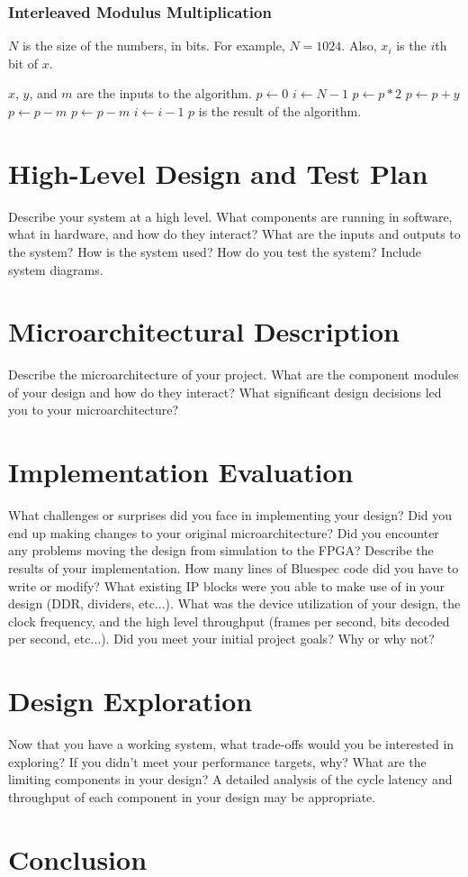 \documentclass[a4paper,11pt]{report}
\begin{document}
\subsection{Interleaved Modulus Multiplication}
$N$ is the size of the numbers, in bits. For example, $N = 1024$.
Also, $x_i$ is the $i$th bit of $x$.
\begin{algorithmic}
\State $x$, $y$, and $m$ are the inputs to the algorithm.
\State $p \gets 0$
\State $i \gets N - 1$
	\State $p \gets p * 2$
		\State $p \gets p + y$
	\EndIf
		\State $p \gets p - m$
	\EndIf
		\State $p \gets p - m$
	\EndIf
  \State $i \gets i - 1$
\EndWhile
\State $p$ is the result of the algorithm.
\end{algorithmic}
\chapter*{High-Level Design and Test Plan} Describe your system at a high level. What components are
running in software, what in hardware, and how do they interact? What are the inputs and
outputs to the system? How is the system used? How do you test the system? Include system
diagrams.
\chapter*{Microarchitectural Description} Describe the microarchitecture of your project. What are the
component modules of your design and how do they interact? What significant design decisions
led you to your microarchitecture?
\chapter*{Implementation Evaluation}
 What challenges or surprises did you face in implementing your
design? Did you end up making changes to your original microarchitecture? Did you encounter
any problems moving the design from simulation to the FPGA?
Describe the results of your implementation. How many lines of Bluespec code did you have to
write or modify? What existing IP blocks were you able to make use of in your design (DDR,
dividers, etc...). What was the device utilization of your design, the clock frequency, and the
high level throughput (frames per second, bits decoded per second, etc...). Did you meet your
initial project goals? Why or why not?
\chapter*{Design Exploration}
 Now that you have a working system, what trade-offs would you be interested
in exploring?
If you didn’t meet your performance targets, why? What are the limiting components in
your design? A detailed analysis of the cycle latency and throughput of each component in
your design may be appropriate. 

\chapter*{Conclusion}
\end{document}
